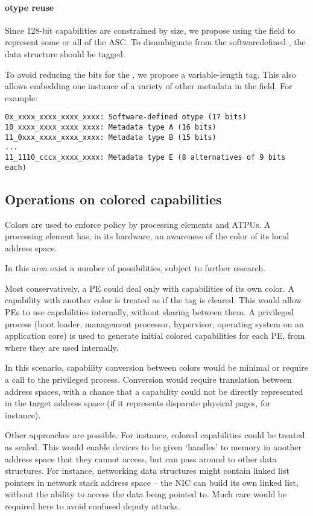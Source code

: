 \paragraph{otype reuse}
\label{app:exp:otype-reuse}
Since 128-bit capabilities are constrained by size, we propose using the \cotype{} field to represent some or all of the ASC.  To disambiguate from the softwaredefined \cotype{}, the data structure should be tagged.

To avoid reducing the bits for the \cotype{}, we propose a variable-length tag.  This also allows embedding one instance of a variety of other metadata in the \cotype{} field.  For example:

\begin{verbatim}
0x_xxxx_xxxx_xxxx_xxxx: Software-defined otype (17 bits)
10_xxxx_xxxx_xxxx_xxxx: Metadata type A (16 bits)
11_0xxx_xxxx_xxxx_xxxx: Metadata type B (15 bits)
...
11_1110_cccx_xxxx_xxxx: Metadata type E (8 alternatives of 9 bits each)
\end{verbatim}


\subsection{Operations on colored capabilities}
Colors are used to enforce policy by processing elements and ATPUs.  A processing element has, in its hardware, an awareness of the color of its local address space.

In this area exist a number of possibilities, subject to further research.

Most conservatively, a PE could deal only with capabilities of its own color.  A capability with another color is treated as if the tag is cleared.  This would allow PEs to use capabilities internally, without sharing between them.  A privileged process (boot loader, management processor, hypervisor, operating system on an application core) is used to generate initial colored capabilities for each PE, from where they are used internally.

In this scenario, capability conversion between colors would be minimal or require a call to the privileged process.
Conversion would require translation between address spaces, with a chance that a capability could not be directly represented in the target address space (if it represents disparate physical pages, for instance).

Other approaches are possible.  For instance, colored capabilities could be treated as sealed.  This would enable devices to be given `handles' to memory in another address space that they cannot access, but can pass around to other data structures.  For instance, networking data structures might contain linked list pointers in network stack address space -- the NIC can build its own linked list, without the ability to access the data being pointed to.  Much care would be required here to avoid confused deputy attacks.

